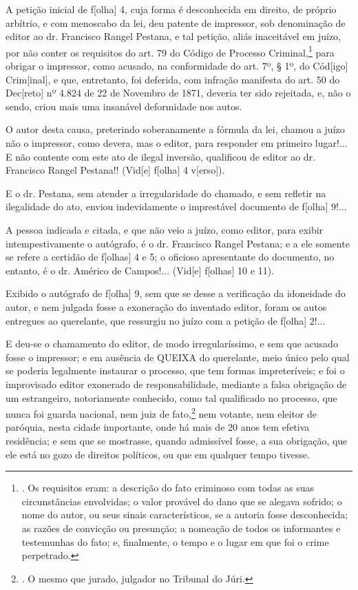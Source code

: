 A petição inicial de f{[}olha{]} 4, cuja forma é desconhecida em
direito, de próprio arbítrio, e com menoscabo da lei, deu patente de
impressor, sob denominação de editor ao dr. Francisco Rangel Pestana, e
tal petição, aliás inaceitável em juízo, por não conter os requisitos do
art. 79 do Código de Processo Criminal,\footnote{. Os requisitos eram: a
  descrição do fato criminoso com todas as suas circunstâncias
  envolvidas; o valor provável do dano que se alegava sofrido; o nome do
  autor, ou seus sinais característicos, se a autoria fosse
  desconhecida; as razões de convicção ou presunção; a nomeação de todos
  os informantes e testemunhas do fato; e, finalmente, o tempo e o lugar
  em que foi o crime perpetrado.} para obrigar o impressor, como
acusado, na conformidade do art. 7º, § 1º, do Cód{[}igo{]}
Crim{[}inal{]}, e que, entretanto, foi deferida, com infração manifesta
do art. 50 do Dec{[}reto{]} nº 4.824 de 22 de Novembro de 1871, deveria
ter sido rejeitada, e, não o sendo, criou mais uma insanável deformidade
nos autos.

O autor desta causa, preterindo soberanamente a fórmula da lei, chamou a
juízo não o impressor, como devera, mas o editor, para responder em
primeiro lugar!... E não contente com este ato de ilegal inversão,
qualificou de editor ao dr. Francisco Rangel Pestana!! (Vid{[}e{]}
f{[}olha{]} 4 v{[}erso{]}).

E o dr. Pestana, sem atender a irregularidade do chamado, e sem refletir
na ilegalidade do ato, enviou indevidamente o imprestável documento de
f{[}olha{]} 9!...

A pessoa indicada e citada, e que não veio a juízo, como editor, para
exibir intempestivamente o autógrafo, é o dr. Francisco Rangel Pestana;
e a ele somente se refere a certidão de f{[}olhas{]} 4 e 5; o oficioso
apresentante do documento, no entanto, é o dr. Américo de Campos!...
(Vid{[}e{]} f{[}olhas{]} 10 e 11).

Exibido o autógrafo de f{[}olha{]} 9, sem que se desse a verificação da
idoneidade do autor, e nem julgada fosse a exoneração do inventado
editor, foram os autos entregues ao querelante, que ressurgiu no juízo
com a petição de f{[}olha{]} 2!...

E deu-se o chamamento do editor, de modo irregularíssimo, e sem que
acusado fosse o impressor; e em ausência de QUEIXA do querelante, meio
único pelo qual se poderia legalmente instaurar o processo, que tem
formas impreteríveis; e foi o improvisado editor exonerado de
responsabilidade, mediante a falsa obrigação de um estrangeiro,
notoriamente conhecido, como tal qualificado no processo, que nunca foi
guarda nacional, nem juiz de fato,\footnote{. O mesmo que jurado,
  julgador no Tribunal do Júri.} nem votante, nem eleitor de paróquia,
nesta cidade importante, onde há mais de 20 anos tem efetiva residência;
e sem que se mostrasse, quando admissível fosse, a sua obrigação, que
ele está no gozo de direitos políticos, ou que em qualquer tempo
tivesse.

